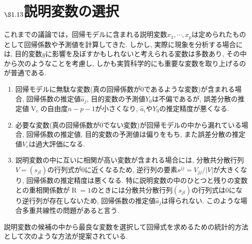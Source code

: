 \section{$\S1.13$説明変数の選択}
これまでの議論では，回帰モデルに含まれる説明変数$x_{1}, \cdots, x_{p}$は定められたものとして回帰係数や予測値を計算してきた. しかし, 実際に現象を分析する場合には, 目的変数$y$に影響を及ぼすかもしれないと考えられる変数は多数あり, その中から次のようなことを考慮し, しかも実質科学的にも重要な変数を取り上げるのが普通である. 

\begin{enumerate}
  \item 回帰モデルに無駄な変数(真の回帰係数が0であるような変数)が含まれる場合, 回帰係数の推定値$\hat{a}_j$, 目的変数の予測値$Y_0$は不偏であるが, 誤差分散の推定値$\operatorname{V}_e$の自由度$n-p-1$が小さくなり, $\hat{a}_i$や$Y_0$の推定精度が悪くなる. 
  \item 必要な変数(真の回帰係数が0でない変数)が回帰モデルの中から漏れている場合, 回帰係数の推定値, 目的変数の予測値は偏りをもち, また誤差分散の推定値$V_e$は過大評価になる. 
  \item 説明変数の中に互いに相関が高い変数が含まれる場合には, 分散共分散行列$V=(s_{jl})$の行列式が0に近くなるため, 逆行列の要素$s^{jj}=V_{jj}/|V|$が大きくなり, 回帰係数の推定精度は悪くなる. 特に説明変数の中のひとつと残りの変数との重相関係数が$\operatorname{R}=1$のときには分散共分散行列$(s_{jl})$の行列式は0になり逆行列が存在しないため, 回帰係数の推定値$\hat{a}_j$は得られない. このような場合{\bm 多重共線性}の問題があると言う. 
\end{enumerate}

説明変数の候補の中から最良な変数を選択して回帰式を求めるための統計的方法として次のような方法が提案されている. 

